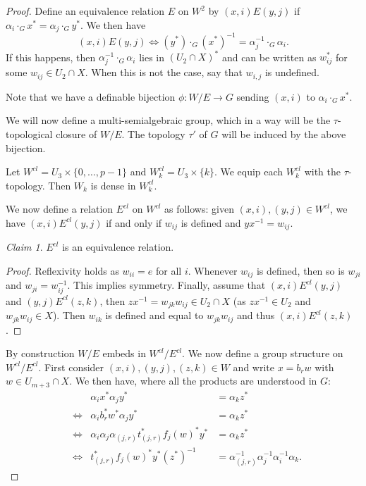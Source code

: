 \documentclass[12pt]{article}
\theoremstyle{definition}
\theoremstyle{mystyle}
\theoremstyle{remark}
\newtheorem*{claim}{Claim}
\newenvironment{claimproof}
    {\begin{proof}}{\renewcommand\qedsymbol{\Squarepipe} \end{proof}}
\newcommand{\cG}{\cdot_G}
\begin{document}
\begin{proof}
Define an equivalence relation $E$ on $W^2$ by $(x,i)E(y,j)$ if $\alpha_i\cG x^* = \alpha_j \cG y^*$. We then have
$$(x,i)E(y,j) \iff (y^*)\cG (x^*)^{-1} = \alpha_j^{-1}\cG \alpha_i.$$
If this happens, then $\alpha_j^{-1}\cG \alpha_i$ lies in
$(U_2\cap X)^*$ and can be written as $w_{ij}^*$ for some
$w_{ij}\in U_2 \cap X$. When this is not the case, say that
$w_{i,j}$ is undefined.

Note that we have a definable bijection $\phi: W/E\to G$ sending
$(x,i)$ to $\alpha_i \cG x^*$.

\bigskip

We will now define
a multi-semialgebraic group, which in a way will be the
$\tau$-topological closure of $W/E$. The topology $\tau'$ of $G$ will be induced by the above bijection.

Let $W^{cl} = U_3 \times \{0,\ldots,p-1\}$ and $W^{cl}_k =
U_3 \times \{k\}$. We equip each $W^{cl}_k$ with the
$\tau$-topology. Then $W_k$ is dense in $W^{cl}_k$.

We now define a relation $E^{cl}$ on $W^{cl}$ as follows: given
$(x,i),(y,j)\in W^{cl}$, we have $(x,i)E^{cl}(y,j)$ if and only if
$w_{ij}$ is defined and $yx^{-1} = w_{ij}$.

\begin{claim} $E^{cl}$ is an equivalence relation.
\end{claim}
\begin{claimproof} Reflexivity holds as $w_{ii}=e$ for all $i$. Whenever $w_{ij}$ is defined, then so is $w_{ji}$ and $w_{ji}=w_{ij}^{-1}$. This implies symmetry. Finally, assume that $(x,i)E^{cl} (y,j)$ and $(y,j)E^{cl} (z,k)$, then $zx^{-1} = w_{jk}w_{ij} \in U_2 \cap X$ (as $zx^{-1}\in U_2$ and $w_{jk}w_{ij}\in X$). Then $w_{ik}$ is defined and equal to $w_{jk}w_{ij}$ and thus $(x,i)E^{cl} (z,k)$.
\end{claimproof}

By construction $W/E$ embeds in $W^{cl}/E^{cl}$. We now define a
group structure on $W^{cl}/E^{cl}$. First consider
$(x,i),(y,j),(z,k)\in W$ and write $x=b_r w$ with $w\in
U_{m+3}\cap X$. We then have, where all the products are
understood in $G$:
\begin{align*}
& & \alpha_i x^*  \alpha_j y^*  &= \alpha_k  z^* \\
&\iff &  \alpha_i  b_r^*  w^* \alpha_j  y^* &= \alpha_k  z^* \\
&\iff & \alpha_i  \alpha_j  \alpha_{(j,r)} t^*_{(j,r)} f_j(w)^* y^* &= \alpha_k z^* \\
&\iff & t_{(j,r)}^* f_j(w)^*y^*(z^*)^{-1} &= \alpha_{(j,r)}^{-1} \alpha_j^{-1} \alpha_i^{-1} \alpha_k.
\end{align*}


\end{proof}
\end{document}

